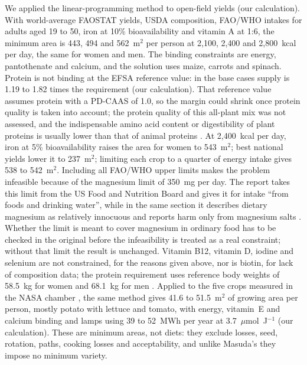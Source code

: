 We applied the linear-programming method to open-field yields (our calculation). With world-average FAOSTAT yields, USDA composition, FAO/WHO intakes for adults aged 19 to 50, iron at 10\% bioavailability and vitamin A at 1:6, the minimum area is 443, 494 and 562~m$^2$ per person at 2{,}100, 2{,}400 and 2{,}800~kcal per day, the same for women and men. The binding constraints are energy, pantothenate and calcium, and the solution uses maize, carrots and spinach. Protein is not binding at the EFSA reference value: in the base cases supply is 1.19 to 1.82 times the requirement (our calculation). That reference value assumes protein with a PD-CAAS of 1.0, so the margin could shrink once protein quality is taken into account; the protein quality of this all-plant mix was not assessed, and the indispensable amino acid content or digestibility of plant proteins is usually lower than that of animal proteins \cite[Section~3.4, p.~18]{efsa2017drv}. At 2{,}400~kcal per day, iron at 5\% bioavailability raises the area for women to 543~m$^2$; best national yields lower it to 237~m$^2$; limiting each crop to a quarter of energy intake gives 538 to 542~m$^2$. Including all FAO/WHO upper limits makes the problem infeasible because of the magnesium limit of 350~mg per day. The report takes this limit from the US Food and Nutrition Board and gives it for intake ``from foods and drinking water'', while in the same section it describes dietary magnesium as relatively innocuous and reports harm only from magnesium salts \cite[p.~225]{faowho2004vitmin}. Whether the limit is meant to cover magnesium in ordinary food has to be checked in the original before the infeasibility is treated as a real constraint; without that limit the result is unchanged. Vitamin B12, vitamin D, iodine and selenium are not constrained, for the reasons given above, nor is biotin, for lack of composition data; the protein requirement uses reference body weights of 58.5~kg for women and 68.1~kg for men \cite[Table~17, p.~91]{efsa2017drv}. Applied to the five crops measured in the NASA chamber \cite[Table~2, p.~711]{wheeler2008crop}, the same method gives 41.6 to 51.5~m$^2$ of growing area per person, mostly potato with lettuce and tomato, with energy, vitamin~E and calcium binding and lamps using 39 to 52~MWh per year at 3.7~$\mu$mol~J$^{-1}$ (our calculation). These are minimum areas, not diets: they exclude losses, seed, rotation, paths, cooking losses and acceptability, and unlike Masuda's they impose no minimum variety.

